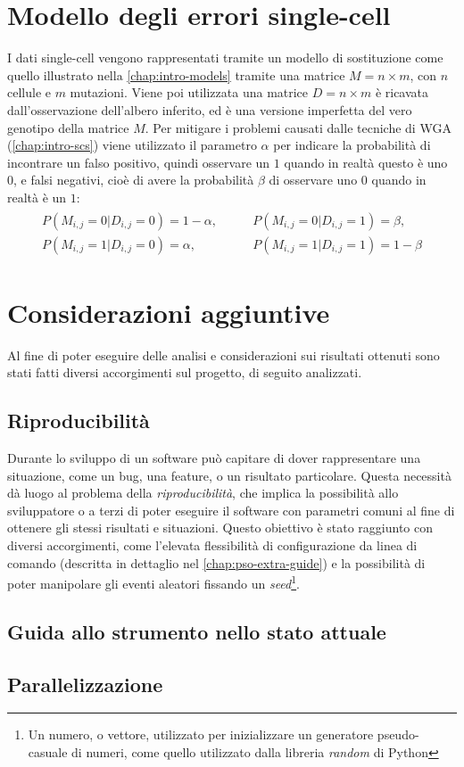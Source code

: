 \section{Modello degli errori single-cell}
\label{chap:pso-matrix}
I dati single-cell vengono rappresentati tramite un modello di sostituzione come quello illustrato nella \autoref{chap:intro-models} tramite una matrice $M = n \times m$, con $n$ cellule e $m$ mutazioni. Viene poi utilizzata una matrice $D = n \times m$ è ricavata dall'osservazione dell'albero inferito, ed è una versione imperfetta del vero genotipo della matrice $M$. Per mitigare i problemi causati dalle tecniche di WGA (\autoref{chap:intro-scs}) viene utilizzato il parametro $\alpha$ per indicare la probabilità di incontrare un falso positivo, quindi osservare un $1$ quando in realtà questo è uno $0$, e falsi negativi, cioè di avere la probabilità $\beta$ di osservare uno $0$ quando in realtà è un $1$:
\begin{align}
    \label{eq:pso-intro-model-matrix}
    \begin{split}
      P(M_{i,j} = 0 | D_{i,j} = 0) = 1 - \alpha, \qquad
      &P(M_{i,j} = 0 | D_{i,j} = 1) = \beta, \\
      P(M_{i,j} = 1 | D_{i,j} = 0) = \alpha, \qquad
      &P(M_{i,j} = 1 | D_{i,j} = 1) = 1 - \beta
    \end{split}
\end{align}

\section{Considerazioni aggiuntive}
Al fine di poter eseguire delle analisi e considerazioni sui risultati ottenuti sono stati fatti diversi accorgimenti sul progetto, di seguito analizzati.

\subsection{Riproducibilità}
Durante lo sviluppo di un software può capitare di dover rappresentare una situazione, come un bug, una feature, o un risultato particolare. Questa necessità dà luogo al problema della \textit{riproducibilità}, che implica la possibilità allo sviluppatore o a terzi di poter eseguire il software con parametri comuni al fine di ottenere gli stessi risultati e situazioni. Questo obiettivo è stato raggiunto con diversi accorgimenti, come l'elevata flessibilità di configurazione da linea di comando (descritta in dettaglio nel \autoref{chap:pso-extra-guide}) e la possibilità di poter manipolare gli eventi aleatori fissando un \textit{seed}\footnote{Un numero, o vettore, utilizzato per inizializzare un generatore pseudo-casuale di numeri, come quello utilizzato dalla libreria \textit{random} di Python}.

\subsection{Guida allo strumento nello stato attuale}
\label{chap:pso-extra-guide}

\subsection{Parallelizzazione}

